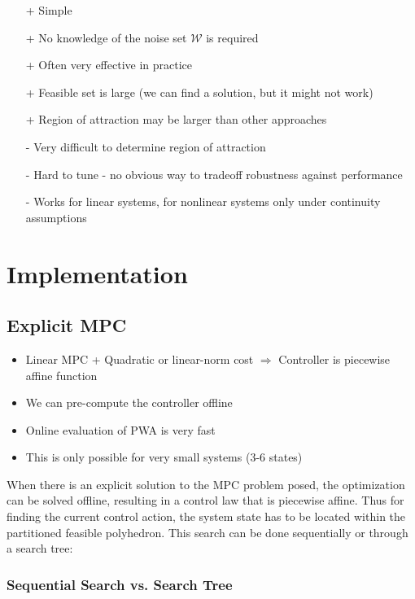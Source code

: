 \documentclass[8pt,a4paper]{scrartcl}
\begin{document}
\begin{multicols*}{3}
\begin{itemize}
\ncompaq
\item[+] Simple
\item[+] No knowledge of the noise set $\mathcal{W}$ is required
\item[+] Often very effective in practice
\item[+] Feasible set is large (we can find a solution, but it might not work)
\item[+] Region of attraction may be larger than other approaches
\item[-] Very difficult to determine region of attraction
\item[-] Hard to tune - no obvious way to tradeoff robustness against performance
\item[-] Works for linear systems, for nonlinear systems only under continuity assumptions

\end{itemize}

\section{Implementation}

\subsection{Explicit MPC}

\begin{itemize}
\ncompaq
\item Linear MPC + Quadratic or linear-norm cost $\Rightarrow$ Controller is piecewise affine function
\item We can pre-compute the controller offline
\item Online evaluation of PWA is very fast
\item This is only possible for very small systems (3-6 states)
\end{itemize}

When there is an explicit solution to the MPC problem posed, the optimization can be solved offline, resulting in a control law that is piecewise affine. Thus for finding the current control action, the system state has to be located within the partitioned feasible polyhedron.  This search can be done sequentially or through a search tree:

\subsubsection{Sequential Search vs. Search Tree}


\end{multicols*}
\end{document}
